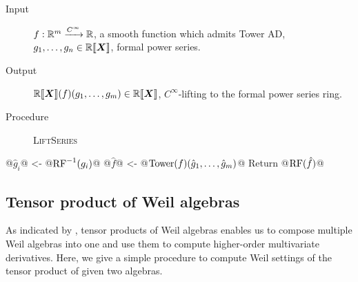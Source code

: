 \documentclass[%
  sigconf,authorversion,screen]{acmart}
\begin{document}
\begin{algorithm}\label{lift-series}
\hfill\vspace{-.25em}
\begin{description}
  \item[Input]
    $f: \mathbb{R}^m \xrightarrow{C^\infty} \mathbb{R}$, a smooth function which admits Tower AD,
    $g_1, \dots, g_n \in \mathord{\mathbb{R}\llbracket\boldsymbol{X}\rrbracket}$, formal power series.
  \item[Output] $\mathord{\mathbb{R}\llbracket\boldsymbol{X}\rrbracket}(f)(g_1, \dots, g_m) \in \mathord{\mathbb{R}\llbracket\boldsymbol{X}\rrbracket}$, $C^\infty$-lifting to the formal power series ring.
  \item[Procedure] \textup{\textsc{LiftSeries}}
\end{description}
\begin{alg}
@$\hat{g}_i$@ <- @$\operatorname{RF}^{-1}(g_i)$@
@$\hat{f}$@ <- @$\mathord{\mathrm{Tower}}(f)(\hat{g}_1, \dots, \hat{g}_m)$@
Return @$\operatorname{RF}(\hat{f})$@
\end{alg}
\end{algorithm}

\subsection{Tensor product of Weil algebras}
\label{sec:tensor-algorithm}
As indicated by , tensor products of Weil algebras enables us to compose multiple Weil algebras into one and use them to compute higher-order multivariate derivatives.
Here, we give a simple procedure to compute Weil settings of the tensor product of given two algebras.
\end{document}
